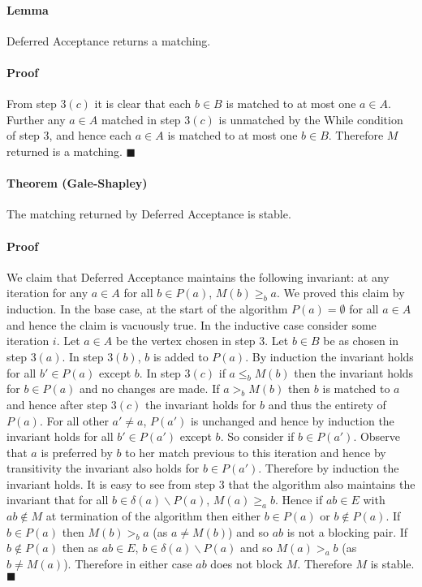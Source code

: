 \paragraph{Lemma} Deferred Acceptance returns a matching.
\paragraph{Proof}
From step $3(c)$ it is clear that each $b \in B$ is matched to at most one $a \in A$. Further any $a \in A$ matched in step $3(c)$ is unmatched by the While condition of step $3$, and hence each $a \in A$ is matched to at most one $b \in B$. Therefore $M$ returned is a matching. $\blacksquare$
\paragraph{Theorem (Gale-Shapley)} The matching returned by Deferred Acceptance is stable.
\paragraph{Proof}
We claim that Deferred Acceptance maintains the following invariant: at any iteration for any $a \in A$ for all $b \in P(a)$, $M(b) \geq_b a$. We proved this claim by induction. In the base case, at the start of the algorithm $P(a) = \emptyset$ for all $a \in A$ and hence the claim is vacuously true. In the inductive case consider some iteration $i$. Let $a\in A$ be the vertex chosen in step $3$. Let $b \in B$ be as chosen in step $3(a)$. In step $3(b)$, $b$ is added to $P(a)$. By induction the invariant holds for all $b' \in P(a)$ except $b$. In step $3(c)$ if $a \leq_b M(b)$ then the invariant holds for $b \in P(a)$ and no changes are made. If $a >_b M(b)$ then $b$ is matched to $a$ and hence after step $3(c)$ the invariant holds for $b$ and thus the entirety of $P(a)$. For all other $a' \neq a$, $P(a')$ is unchanged and hence by induction the invariant holds for all $b' \in P(a')$ except $b$. So consider if $b \in P(a')$. Observe that $a$ is preferred by $b$ to her match previous to this iteration and hence by transitivity the invariant also holds for $b \in P(a')$. Therefore by induction the invariant holds. It is easy to see from step $3$ that the algorithm also maintains the invariant that for all $b \in \delta(a)\backslash P(a)$, $M(a) \geq_a b$. Hence if $ab \in E$ with $ab \not\in M$ at termination of the algorithm then either $b \in P(a)$ or $b \not\in P(a)$. If $b \in P(a)$ then $M(b) >_b a$ (as $a \neq M(b)$) and so $ab$ is not a blocking pair. If $b \not\in P(a)$ then as $ab \in E$, $b \in \delta(a) \backslash P(a)$ and so $M(a) >_a b$ (as $b \neq M(a)$). Therefore in either case $ab$ does not block $M$. Therefore $M$ is stable. $\blacksquare$
